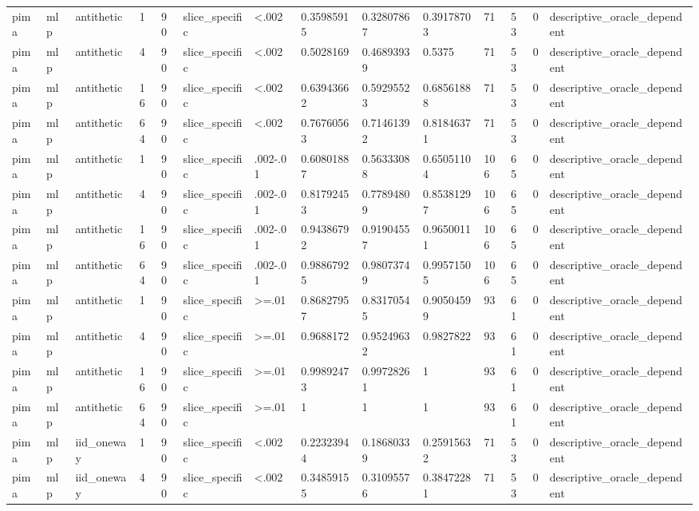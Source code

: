 \begin{tabular}{llllllllllllll}
pima & mlp & antithetic & 1 & 90 & slice\_specific & <.002 & 0.35985915 & 0.32807867 & 0.39178703 & 71 & 53 & 0 & descriptive\_oracle\_dependent \\
pima & mlp & antithetic & 4 & 90 & slice\_specific & <.002 & 0.5028169 & 0.46893939 & 0.5375 & 71 & 53 & 0 & descriptive\_oracle\_dependent \\
pima & mlp & antithetic & 16 & 90 & slice\_specific & <.002 & 0.63943662 & 0.59295523 & 0.68561888 & 71 & 53 & 0 & descriptive\_oracle\_dependent \\
pima & mlp & antithetic & 64 & 90 & slice\_specific & <.002 & 0.76760563 & 0.71461392 & 0.81846371 & 71 & 53 & 0 & descriptive\_oracle\_dependent \\
pima & mlp & antithetic & 1 & 90 & slice\_specific & .002-.01 & 0.60801887 & 0.56333088 & 0.65051104 & 106 & 65 & 0 & descriptive\_oracle\_dependent \\
pima & mlp & antithetic & 4 & 90 & slice\_specific & .002-.01 & 0.81792453 & 0.77894809 & 0.85381297 & 106 & 65 & 0 & descriptive\_oracle\_dependent \\
pima & mlp & antithetic & 16 & 90 & slice\_specific & .002-.01 & 0.94386792 & 0.91904557 & 0.96500111 & 106 & 65 & 0 & descriptive\_oracle\_dependent \\
pima & mlp & antithetic & 64 & 90 & slice\_specific & .002-.01 & 0.98867925 & 0.98073749 & 0.99571505 & 106 & 65 & 0 & descriptive\_oracle\_dependent \\
pima & mlp & antithetic & 1 & 90 & slice\_specific & >=.01 & 0.86827957 & 0.83170545 & 0.90504599 & 93 & 61 & 0 & descriptive\_oracle\_dependent \\
pima & mlp & antithetic & 4 & 90 & slice\_specific & >=.01 & 0.9688172 & 0.95249632 & 0.9827822 & 93 & 61 & 0 & descriptive\_oracle\_dependent \\
pima & mlp & antithetic & 16 & 90 & slice\_specific & >=.01 & 0.99892473 & 0.99728261 & 1 & 93 & 61 & 0 & descriptive\_oracle\_dependent \\
pima & mlp & antithetic & 64 & 90 & slice\_specific & >=.01 & 1 & 1 & 1 & 93 & 61 & 0 & descriptive\_oracle\_dependent \\
pima & mlp & iid\_oneway & 1 & 90 & slice\_specific & <.002 & 0.22323944 & 0.18680339 & 0.25915632 & 71 & 53 & 0 & descriptive\_oracle\_dependent \\
pima & mlp & iid\_oneway & 4 & 90 & slice\_specific & <.002 & 0.34859155 & 0.31095576 & 0.38472281 & 71 & 53 & 0 & descriptive\_oracle\_dependent \\

\end{tabular}
